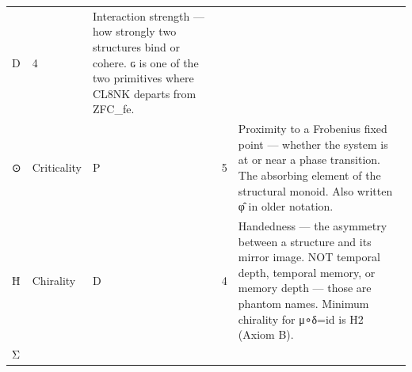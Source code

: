 \documentclass[12pt,a4paper]{article}
\begin{document}
\begin{longtable}[]{@{}lllll@{}}
\begin{minipage}[t]{0.16\columnwidth}
D\strut
\end{minipage} & \begin{minipage}[t]{0.16\columnwidth}\raggedright
4\strut
\end{minipage} & \begin{minipage}[t]{0.27\columnwidth}\raggedright
Interaction strength --- how strongly two structures bind or cohere. ɢ
is one of the two primitives where CL8NK departs from ZFC\_fe.\strut
\end{minipage}\tabularnewline
\begin{minipage}[t]{0.14\columnwidth}\raggedright
⊙\strut
\end{minipage} & \begin{minipage}[t]{0.12\columnwidth}\raggedright
Criticality\strut
\end{minipage} & \begin{minipage}[t]{0.16\columnwidth}\raggedright
P\strut
\end{minipage} & \begin{minipage}[t]{0.16\columnwidth}\raggedright
5\strut
\end{minipage} & \begin{minipage}[t]{0.27\columnwidth}\raggedright
Proximity to a Frobenius fixed point --- whether the system is at or
near a phase transition. The absorbing element of the structural monoid.
Also written φ̂ in older notation.\strut
\end{minipage}\tabularnewline
\begin{minipage}[t]{0.14\columnwidth}\raggedright
Ħ\strut
\end{minipage} & \begin{minipage}[t]{0.12\columnwidth}\raggedright
Chirality\strut
\end{minipage} & \begin{minipage}[t]{0.16\columnwidth}\raggedright
D\strut
\end{minipage} & \begin{minipage}[t]{0.16\columnwidth}\raggedright
4\strut
\end{minipage} & \begin{minipage}[t]{0.27\columnwidth}\raggedright
Handedness --- the asymmetry between a structure and its mirror image.
NOT temporal depth, temporal memory, or memory depth --- those are
phantom names. Minimum chirality for μ∘δ=id is H2 (Axiom B).\strut
\end{minipage}\tabularnewline
\begin{minipage}[t]{0.14\columnwidth}\raggedright
Σ\strut
\end{minipage} & \begin{minipage}[t]{0.12\columnwidth}\raggedright

\end{minipage}
\end{longtable}
\end{document}
